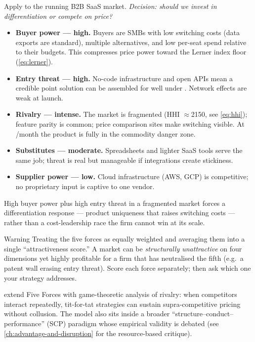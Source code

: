 \begin{example}
Apply to the running B2B SaaS market. \emph{Decision: should we invest in differentiation
or compete on price?}

\begin{itemize}
  \item \textbf{Buyer power --- high.} Buyers are SMBs with low switching costs (data exports
        are standard), multiple alternatives, and low per-seat spend relative to their budgets.
        This compresses price power toward the Lerner index floor (\cref{eq:lerner}).
  \item \textbf{Entry threat --- high.} No-code infrastructure and open APIs mean a credible
        point solution can be assembled for well under . Network effects are
        weak at launch.
  \item \textbf{Rivalry --- intense.} The market is fragmented (HHI $\approx$\num{2150},
        see \cref{eq:hhi}); feature parity is common; price comparison sites make switching
        visible. At /month the product is fully in the commodity danger zone.
  \item \textbf{Substitutes --- moderate.} Spreadsheets and lighter SaaS tools serve the
        same job; threat is real but manageable if integrations create stickiness.
  \item \textbf{Supplier power --- low.} Cloud infrastructure (AWS, GCP) is competitive;
        no proprietary input is captive to one vendor.
\end{itemize}

High buyer power plus high entry threat in a fragmented market forces a differentiation
response --- product uniqueness that raises switching costs --- rather than a cost-leadership
race the firm cannot win at its scale.
\end{example}

\begin{admonition}{Warning}
Treating the five forces as equally weighted and averaging them into a single
``attractiveness score.'' A market can be \emph{structurally unattractive} on four
dimensions yet highly profitable for a firm that has neutralised the fifth (e.g.\ a patent
wall erasing entry threat). Score each force separately; then ask which one your strategy
addresses.
\end{admonition}

\textcite{dranove7theconomics} extend Five Forces with game-theoretic analysis of rivalry:
when competitors interact repeatedly, tit-for-tat strategies can sustain supra-competitive
pricing without collusion. The model also sits inside a broader ``structure--conduct--
performance'' (SCP) paradigm whose empirical validity is debated (see
\cref{ch:advantage-and-disruption} for the resource-based critique).


